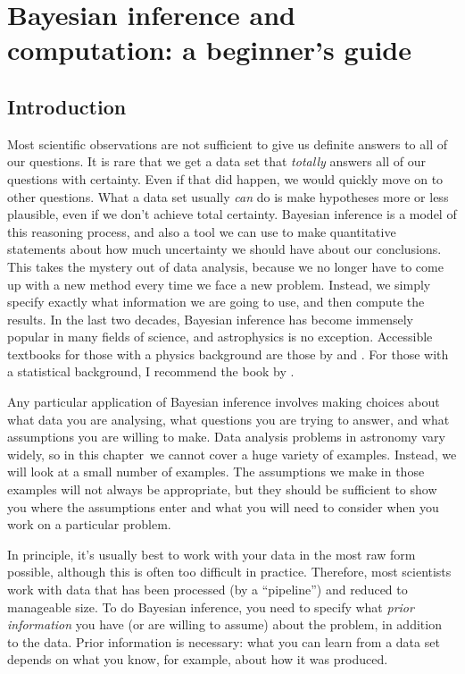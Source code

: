 \newcommand{\btheta}{\boldsymbol{\theta}}
\newcommand{\data}{\boldsymbol{D}}
\newcommand{\documentname}{chapter}

\author[Brendon J. Brewer]{Brendon J. Brewer\\
Department of Statistics, The University of Auckland}

\chapter{Bayesian inference and computation: a beginner's guide}

\section{Introduction}
Most scientific observations are not sufficient to give us definite answers
to all of our questions. It is rare that we get a data set that {\it totally}
answers all of our questions with certainty. Even if that did happen, we would
quickly move on to other questions.
What a data set usually {\it can} do is make hypotheses more or less plausible,
even if we don't achieve total certainty.
Bayesian inference is a model of this
reasoning process, and also a tool we can use
to make quantitative statements about how much
uncertainty we should have about our conclusions. This takes the mystery out
of data analysis, because we no longer have to come up with a new method
every time we face a new problem. Instead, we simply specify exactly what
information we are going to use, and then compute the results.
In the last two decades, Bayesian inference has become immensely popular in
many fields of science, and astrophysics is no exception. Accessible textbooks
for those with a physics background are those by \citet{gregory} and
\citet{sivia}. For those with a statistical background, I recommend the book
by \citet{ohagan}.

Any particular application of Bayesian inference involves making choices
about what data you are analysing, what questions you are
trying to answer, and what assumptions you are willing to make.
Data analysis problems in astronomy vary widely, so in this \documentname~we
cannot cover a huge variety of examples. Instead, we will look at a small
number of examples. The assumptions we make in those examples will not always
be appropriate, but they should be sufficient to show you where the assumptions
enter and what you will need to consider when you work on a particular problem.

In principle, it's usually best to work with your data in the most
raw form possible, although this is often too difficult in practice.
Therefore, most scientists work with data that has been processed (by a ``pipeline'') and reduced to manageable size. To do Bayesian inference, you
need to specify what {\it prior information} you have (or are willing to
assume) about the problem, in addition to the data. Prior information is
necessary: what you can learn from a data set depends on what you know, for
example, about how it was produced.

